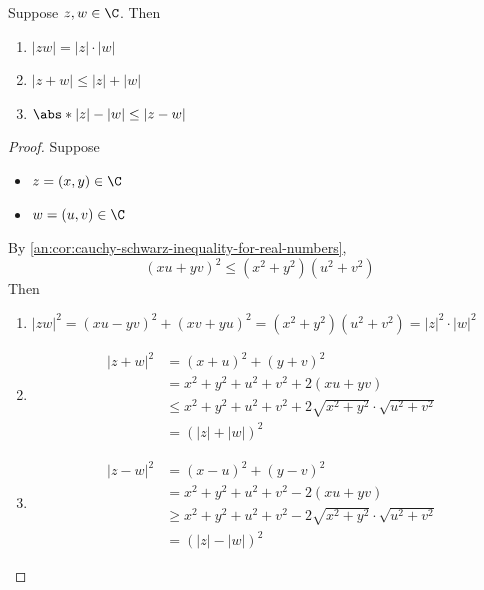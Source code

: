 \bigskip

\begin{theorem} \label{an:thm:properties-of-modulus}
  Suppose $z, w \in \C$. Then
  \begin{enumerate}[label=\textbf{(\Alph*)}]
    \item $|zw| = |z| \cdot |w|$
    \item $|z + w| \leq |z| + |w|$
    \item $\abs*{|z| - |w|} \leq |z - w|$
  \end{enumerate}
\end{theorem}

\begin{proof}
  Suppose
  \begin{itemize}
    \item $z = (x, y) \in \C$
    \item $w = (u, v) \in \C$
  \end{itemize}
  By \cref{an:cor:cauchy-schwarz-inequality-for-real-numbers},
  \[
    (xu + yv)^{2} \leq (x^{2} + y^{2})(u^{2} + v^{2})
  \]
  Then
  \begin{enumerate}[label=\textbf{(\Alph*)}]
    \item $|zw|^{2} = (xu - yv)^{2} + (xv + yu)^{2} = (x^{2} + y^{2})(u^{2} + v^{2}) = |z|^{2} \cdot |w|^{2}$
    \item \begin{align*}
            |z + w|^{2} & = (x + u)^{2} + (y + v)^{2}                                                           \\
                        & = x^{2} + y^{2} + u^{2} + v^{2} + 2(xu + yv)                                          \\
                        & \leq x^{2} + y^{2} + u^{2} + v^{2} + 2\sqrt{x^{2} + y^{2}} \cdot \sqrt{u^{2} + v^{2}} \\
                        & = (|z| + |w|)^{2}
          \end{align*}
    \item \begin{align*}
            |z - w|^{2} & = (x - u)^{2} + (y - v)^{2}                                                           \\
                        & = x^{2} + y^{2} + u^{2} + v^{2} - 2(xu + yv)                                          \\
                        & \geq x^{2} + y^{2} + u^{2} + v^{2} - 2\sqrt{x^{2} + y^{2}} \cdot \sqrt{u^{2} + v^{2}} \\
                        & = (|z| - |w|)^{2}
          \end{align*}
  \end{enumerate}
\end{proof}
